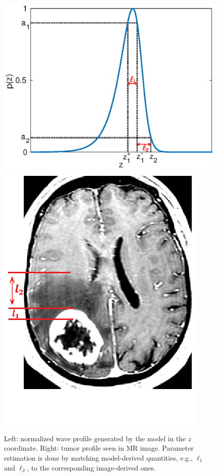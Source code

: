\documentclass{aims}
\numberwithin{equation}{section}
\begin{document}
\begin{figure}
\begin{center}
\includegraphics[scale=0.56]{plots/waveprofile.eps}
\includegraphics[scale=0.33]{plots/MR.png}
\end{center}
\caption{Left: normalized wave profile generated by the model in the
$z$ coordinate.
Right: tumor profile seen in MR image. Parameter estimation is done by
matching
model-derived quantities, e.g., $\ell_1$ and $\ell_2$, to the corresponding
image-derived ones.}
\label{fig:matchwidth} 
\end{figure}
\end{document}
